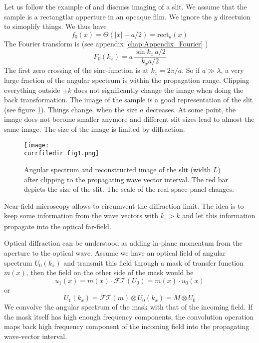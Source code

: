 Let us follow the example of \cite{Vigoureux92} and discuiss imaging of a slit. We assume that the sample is a rectangtlar apperture in an opcaque film. We ignore the $y$ directuion to simoplify things. We thus have
\begin{equation}
    f_0(x) = \Theta ( |x| - a/2 ) =  \text{rect} _a (x)
\end{equation}
The Fourier transform is (see appendix \ref{chap:Appendix_Fourier}
)
\begin{equation}
   F_0(k_x) = a\, \frac{\sin k_x  \, a / 2}{k_x a /2}
\end{equation}
The first zero crossing of the sinc-function is at $k_x = 2 \pi / a$. So if $a \gg \lambda$, a very large fraction of the angular spectrum is within the propagation range. Clipping everything outside $\pm k$ does not significantly change the image when doing the back transformation. The image of the sample is a good representation of the slit (see figure \ref{fig:micro_ft_slit}). Things change, when the size $a$ decreases. At some point, the image does not become smaller anymore and different slit sizes lead to almost the same image. The size of the image is limited by diffraction.


\begin{figure}
    \texttt{[image: \\currfiledir fig1.png]}
    \caption{Angular spectrum and reconstructed image of the slit (width $L$) after clipping to the propagating wave vector interval. The red bar depicts the size of the slit. The scale of the real-space panel changes. \label{fig:micro_ft_slit}}
\end{figure}


Near-field microscopy allows to circumvent the diffraction limit. The idea is to keep some information from the wave vectors with $k_\parallel > k$ and let this information propagate into the optical far-field. 

Optical diffraction can be understood as adding in-plane momentum from the aperture to the optical wave. Assume we have an optical field of angular spectrum $U_0 (k_x)$ and transmit this field through a mask of transfer function $m(x)$, then the field on the other side of the mask would be 
\begin{equation}
    u_1(x) = m(x) \cdot \mathcal{FT} (U_0) = m(x) \cdot u_0(x)
\end{equation}
or
\begin{equation}
    U_1(k_x) = \mathcal{FT}( m ) \otimes U_0(k_x) = M \otimes  U_0
\end{equation}
We convolve the angular spectrum of the mask with that of the incoming field. If the mask itself has high enough frequency components, the convolution operation maps back high frequency component of the incoming field into the propagating wave-vector interval.


